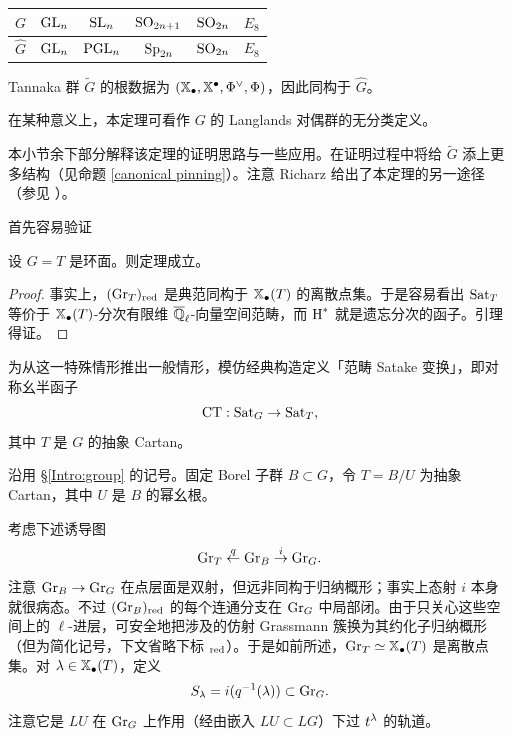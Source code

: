 \begin{center}
\begin{tabular}{| c | c | c | c | c | c |}
\hline 
$G$ & ${\operatorname{GL}}_n$ & $\operatorname{SL}_n$ & $\operatorname{SO}_{2n+1}$ & $\operatorname{SO}_{2n}$ & $E_8$  \\ \hline 
$\hat G$ & ${\operatorname{GL}}_n$ & $\operatorname{PGL}_{n}$ & $\operatorname{Sp}_{2n}$ & $\operatorname{SO}_{2n}$ & $E_8$ \\ \hline 
\end{tabular}
\end{center}

\begin{thm}\label{birth of dual group}
Tannaka 群 $\tilde G$ 的根数据为 $(\mathbb{X}_\bullet,\mathbb{X}^\bullet,\Phi^\vee,\Phi)$，因此同构于 $\hat G$。
\end{thm}

\begin{rmk}
在某种意义上，本定理可看作 $G$ 的 Langlands 对偶群的无分类定义。
\end{rmk}

本小节余下部分解释该定理的证明思路与一些应用。在证明过程中将给 $\tilde G$ 添上更多结构（见命题 \ref{canonical pinning}）。注意 Richarz 给出了本定理的另一途径（参见 \cite[\S~3]{Ri}）。

首先容易验证

\begin{lem}
设 $G=T$ 是环面。则定理成立。
\end{lem}

\begin{proof}
事实上，$({\operatorname{Gr}}_T)_{\operatorname{red}}$ 是典范同构于 $\mathbb{X}_\bullet(T)$ 的离散点集。于是容易看出 ${\operatorname{Sat}}_T$ 等价于 $\mathbb{X}_\bullet(T)$-分次有限维 ${\overline{{\mathbb Q}}_\ell}$-向量空间范畴，而 $\operatorname{H}^*$ 就是遗忘分次的函子。引理得证。
\end{proof}

为从这一特殊情形推出一般情形，模仿经典构造定义「范畴 Satake 变换」，即对称幺半函子
\[\operatorname{CT}:{\operatorname{Sat}}_G\to {\operatorname{Sat}}_T,\]
其中 $T$ 是 $G$ 的抽象 Cartan。

沿用 \S\ref{Intro:group} 的记号。固定 Borel 子群 $B\subset G$，令 $T=B/U$ 为抽象 Cartan，其中 $U$ 是 $B$ 的幂幺根。

考虑下述诱导图
\begin{equation}\label{CT diagram}
{\operatorname{Gr}}_{T}\stackrel{q}{\leftarrow} {\operatorname{Gr}}_{B}\stackrel{i}{\to} {\operatorname{Gr}}_{G}.
\end{equation}
注意 ${\operatorname{Gr}}_{B}\to {\operatorname{Gr}}_{G}$ 在点层面是双射，但远非同构于归纳概形；事实上态射 $i$ 本身就很病态。不过 $({\operatorname{Gr}}_B)_{\operatorname{red}}$ 的每个连通分支在 ${\operatorname{Gr}}_G$ 中局部闭。由于只关心这些空间上的 $\ell$-进层，可安全地把涉及的仿射 Grassmann 簇换为其约化子归纳概形（但为简化记号，下文省略下标 $_{\operatorname{red}}$）。于是如前所述，${\operatorname{Gr}}_T\simeq \mathbb{X}_\bullet(T)$ 是离散点集。对 ${\lambda}\in\mathbb{X}_\bullet(T)$，定义
\[S_{\lambda}= i(q^{-1}({\lambda}))\subset {\operatorname{Gr}}_G.\]
注意它是 $LU$ 在 ${\operatorname{Gr}}_G$ 上作用（经由嵌入 $LU\subset LG$）下过 $t^{\lambda}$ 的轨道。


